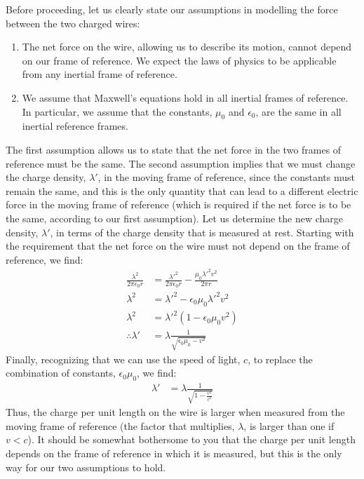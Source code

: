 Before proceeding, let us clearly state our assumptions in modelling the force between the two charged wires:
\begin{enumerate}
\item The net force on the wire, allowing us to describe its motion, cannot depend on our frame of reference. We expect the laws of physics to be applicable from any inertial frame of reference.
\item We assume that Maxwell's equations hold in all inertial frames of reference. In particular, we assume that the constants, $\mu_0$ and $\epsilon_0$, are the same in all inertial reference frames.
\end{enumerate}
The first assumption allows us to state that the net force in the two frames of reference must be the same. The second assumption implies that we must change the charge density, $\lambda'$, in the moving frame of reference, since the constants must remain the same, and this is the only quantity that can lead to a different electric force in the moving frame of reference (which is required if the net force is to be the same, according to our first assumption). Let us determine the new charge density, $\lambda'$, in terms of the charge density that is measured at rest. Starting with the requirement that the net force on the wire must not depend on the frame of reference, we find:
\begin{align*}
\frac{\lambda^2}{2\pi \epsilon_0r}&=\frac{\lambda'^2}{2\pi \epsilon_0r}  -\frac{\mu_0 \lambda'^2 v^2}{2\pi r}\\
\lambda^2&=\lambda'^2-\epsilon_0\mu_0\lambda'^2 v^2\\
\lambda^2&=\lambda'^2(1-\epsilon_0\mu_0v^2)\\
\therefore \lambda'&=\lambda \frac{1}{\sqrt{\epsilon_0\mu_0-v^2}}
\end{align*}
Finally, recognizing that we can use the speed of light, $c$, to replace the combination of constants, $\epsilon_0\mu_0$, we find:
\begin{align*}
\lambda'&=\lambda \frac{1}{\sqrt{1-\frac{v^2}{c^2}}}
\end{align*}
Thus, the charge per unit length on the wire is larger when measured from the moving frame of reference (the factor that multiplies, $\lambda$, is larger than one if $v<c$). It should be somewhat bothersome to you that the charge per unit length depends on the frame of reference in which it is measured, but this is the only way for our two assumptions to hold.

